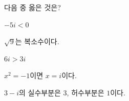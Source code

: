 다음 중 옳은 것은?
\begin{choicesv}{\rule[-3ex]{0pt}{8ex}$-5i<0$}{\rule[-3ex]{0pt}{8ex}$\sqrt{9}$는 복소수이다.}{\rule[-3ex]{0pt}{8ex}$6i>3i$}{\rule[-3ex]{0pt}{8ex}$x^2=-1$이면 $x=i$이다.}{\rule[-3ex]{0pt}{8ex}$3-i$의 실수부분은 $3$, 허수부분은 $1$이다.}\end{choicesv}
